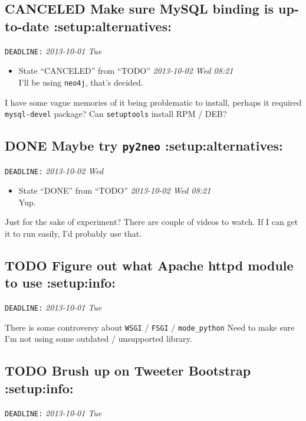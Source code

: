 \documentclass[11pt]{article}
\begin{document}
\subsection{\textbf{CANCELED} Make sure MySQL binding is up-to-date \textbf{:setup:alternatives:}}
\label{sec-2-2}

   \texttt{DEADLINE:} \textit{2013-10-01 Tue}

\begin{itemize}
\item State ``CANCELED''   from ``TODO''       \textit{2013-10-02 Wed 08:21} \\
I'll be using \texttt{neo4j}, that's decided.
\end{itemize}
   I have some vague memories of it being problematic to install,
   perhaps it required \texttt{mysql-devel} package? Can \texttt{setuptools}
   install RPM / DEB?
\subsection{\textbf{DONE} Maybe try \texttt{py2neo} \textbf{:setup:alternatives:}}
\label{sec-2-3}

   \texttt{DEADLINE:} \textit{2013-10-02 Wed}

\begin{itemize}
\item State ``DONE''       from ``TODO''       \textit{2013-10-02 Wed 08:21} \\
Yup.
\end{itemize}
   Just for the sake of experiment? There are couple of videos to
   watch. If I can get it to run easily, I'd probably use that.
\subsection{\textbf{TODO} Figure out what Apache httpd module to use \textbf{:setup:info:}}
\label{sec-2-4}

   \texttt{DEADLINE:} \textit{2013-10-01 Tue}

   There is some controversy about \texttt{WSGI} / \texttt{FSGI} / \texttt{mode\_python}
   Need to make sure I'm not using some outdated / unsupported
   library.
\subsection{\textbf{TODO} Brush up on Tweeter Bootstrap \textbf{:setup:info:}}
\label{sec-2-5}

   \texttt{DEADLINE:} \textit{2013-10-01 Tue}
\end{document}
